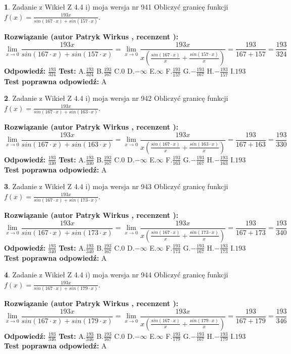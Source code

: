 \documentclass[12pt, a4paper]{article}
\theoremstyle{definition} %
\newtheorem{zad}{}
\newcommand{\zadStart}[1]{\begin{zad}#1\newline}
\newcommand{\zadStop}{\end{zad}}
\newcommand{\rozwStart}[2]{\noindent \textbf{Rozwiązanie (autor #1 , recenzent #2): }\newline}
\newcommand{\rozwStop}{\newline}
\newcommand{\odpStart}{\noindent \textbf{Odpowiedź:}\newline}
\newcommand{\odpStop}{\newline}
\newcommand{\testStart}{\noindent \textbf{Test:}\newline}
\newcommand{\testStop}{\newline}
\newcommand{\kluczStart}{\noindent \textbf{Test poprawna odpowiedź:}\newline}
\newcommand{\kluczStop}{\newline}
\begin{document}
\zadStart{Zadanie z Wikieł Z 4.4 i) moja wersja nr 941}
Obliczyć granicę funkcji $f(x)=\frac{193x}{sin(167\cdot x) +sin(157\cdot x)}$.
\zadStop
\rozwStart{Patryk Wirkus}{}
$$\lim\limits_{x\to 0}\frac{193x}{sin(167\cdot x) +sin(157\cdot x)}=\lim\limits_{x\to 0}\frac{193x}{x(\frac{sin(167\cdot x)}{x}+\frac{sin(157\cdot x)}{x})}=\frac{193}{167+157} = \frac{193}{324}$$
\rozwStop
\odpStart
$\frac{193}{324}$
\odpStop
\testStart
A.$\frac{193}{324}$
B.$\frac{193}{167}$
C.$0$
D.$-\infty$
E.$\infty$
F.$\frac{193}{157}$
G.$-\frac{193}{167}$
H.$-\frac{193}{157}$
I.$193$
\testStop
\kluczStart
A
\kluczStop



\zadStart{Zadanie z Wikieł Z 4.4 i) moja wersja nr 942}
Obliczyć granicę funkcji $f(x)=\frac{193x}{sin(167\cdot x) +sin(163\cdot x)}$.
\zadStop
\rozwStart{Patryk Wirkus}{}
$$\lim\limits_{x\to 0}\frac{193x}{sin(167\cdot x) +sin(163\cdot x)}=\lim\limits_{x\to 0}\frac{193x}{x(\frac{sin(167\cdot x)}{x}+\frac{sin(163\cdot x)}{x})}=\frac{193}{167+163} = \frac{193}{330}$$
\rozwStop
\odpStart
$\frac{193}{330}$
\odpStop
\testStart
A.$\frac{193}{330}$
B.$\frac{193}{167}$
C.$0$
D.$-\infty$
E.$\infty$
F.$\frac{193}{163}$
G.$-\frac{193}{167}$
H.$-\frac{193}{163}$
I.$193$
\testStop
\kluczStart
A
\kluczStop



\zadStart{Zadanie z Wikieł Z 4.4 i) moja wersja nr 943}
Obliczyć granicę funkcji $f(x)=\frac{193x}{sin(167\cdot x) +sin(173\cdot x)}$.
\zadStop
\rozwStart{Patryk Wirkus}{}
$$\lim\limits_{x\to 0}\frac{193x}{sin(167\cdot x) +sin(173\cdot x)}=\lim\limits_{x\to 0}\frac{193x}{x(\frac{sin(167\cdot x)}{x}+\frac{sin(173\cdot x)}{x})}=\frac{193}{167+173} = \frac{193}{340}$$
\rozwStop
\odpStart
$\frac{193}{340}$
\odpStop
\testStart
A.$\frac{193}{340}$
B.$\frac{193}{167}$
C.$0$
D.$-\infty$
E.$\infty$
F.$\frac{193}{173}$
G.$-\frac{193}{167}$
H.$-\frac{193}{173}$
I.$193$
\testStop
\kluczStart
A
\kluczStop



\zadStart{Zadanie z Wikieł Z 4.4 i) moja wersja nr 944}
Obliczyć granicę funkcji $f(x)=\frac{193x}{sin(167\cdot x) +sin(179\cdot x)}$.
\zadStop
\rozwStart{Patryk Wirkus}{}
$$\lim\limits_{x\to 0}\frac{193x}{sin(167\cdot x) +sin(179\cdot x)}=\lim\limits_{x\to 0}\frac{193x}{x(\frac{sin(167\cdot x)}{x}+\frac{sin(179\cdot x)}{x})}=\frac{193}{167+179} = \frac{193}{346}$$
\rozwStop
\odpStart
$\frac{193}{346}$
\odpStop
\testStart
A.$\frac{193}{346}$
B.$\frac{193}{167}$
C.$0$
D.$-\infty$
E.$\infty$
F.$\frac{193}{179}$
G.$-\frac{193}{167}$
H.$-\frac{193}{179}$
I.$193$
\testStop
\kluczStart
A
\kluczStop
\end{document}
